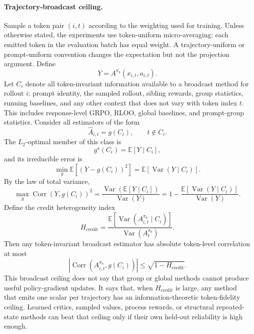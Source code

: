 \documentclass[11pt]{article}
\newcommand{\grpo}{\textsc{GRPO}}
\newcommand{\E}{\mathbb{E}}
\begin{document}
\paragraph{Trajectory-broadcast ceiling.}
Sample a token pair $(i,t)$ according to the weighting used for training.
Unless otherwise stated, the experiments use token-uniform micro-averaging:
each emitted token in the evaluation batch has equal weight. A
trajectory-uniform or prompt-uniform convention changes the expectation but not
the projection argument. Define
\begin{equation}
Y = A^{\pi_b}(x_{i,t},a_{i,t}).
\end{equation}
Let $C_i$ denote all token-invariant information available to a broadcast
method for rollout $i$: prompt identity, the sampled rollout, sibling rewards,
group statistics, running baselines, and any other context that does not vary
with token index $t$. This includes response-level \grpo, RLOO, global
baselines, and prompt-group statistics. Consider all estimators of the form
\begin{equation}
\widehat A_{i,t} = g(C_i),
\qquad t\notin C_i .
\end{equation}
The $L_2$-optimal member of this class is
\begin{equation}
g^\star(C_i)=\E[Y\mid C_i],
\end{equation}
and its irreducible error is
\begin{equation}
\min_g \E[(Y-g(C_i))^2]
=
\E[\operatorname{Var}(Y\mid C_i)].
\end{equation}
By the law of total variance,
\begin{equation}
\max_g \operatorname{Corr}(Y,g(C_i))^2
=
\frac{\operatorname{Var}(\E[Y\mid C_i])}{\operatorname{Var}(Y)}
=
1 -
\frac{\E[\operatorname{Var}(Y\mid C_i)]}{\operatorname{Var}(Y)}.
\end{equation}
Define the credit heterogeneity index
\begin{equation}
H_{\mathrm{credit}}
=
\frac{\E[\operatorname{Var}(A^{\pi_b}_{i,t}\mid C_i)]}
{\operatorname{Var}(A^{\pi_b}_t)}.
\end{equation}
Then any token-invariant broadcast estimator has absolute token-level correlation at
most
\begin{equation}
|\operatorname{Corr}(A^{\pi_b}_{i,t},g(C_i))|
\le
\sqrt{1-H_{\mathrm{credit}}}.
\end{equation}
This broadcast ceiling does not say that group or global methods
cannot produce useful policy-gradient updates. It says that, when
$H_{\mathrm{credit}}$ is large, any method that emits one scalar per trajectory
has an information-theoretic token-fidelity ceiling. Learned critics, sampled
values, process rewards, or structural repeated-state methods can beat that
ceiling only if their own held-out reliability is high enough.
\end{document}
